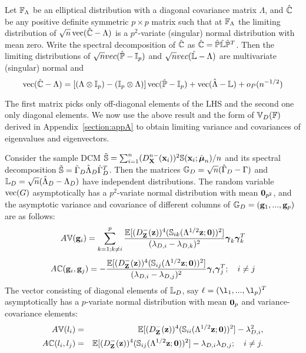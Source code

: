 \begin{Theorem}
\label{Theorem:decomp} \citep{taskinen12}
Let ${\mathbb{F}}_\Lambda$ be an elliptical distribution with a diagonal covariance matrix $\Lambda$, and $\hat {{\mathbb{C}}}$ be any positive definite symmetric $p \times p$ matrix such that at ${\mathbb{F}}_\Lambda$ the limiting distribution of $\sqrt n \operatorname*{vec} (\hat {{\mathbb{C}}} - \Lambda)$ is a $p^2$-variate (singular) normal distribution with mean zero. Write the spectral decomposition of $\hat {{\mathbb{C}}}$ as $\hat {{\mathbb{C}}} = \hat {{\mathbb{P}}} \hat {{\mathbb{L}}} \hat {{\mathbb{P}}}^T$. Then the limiting distributions of $\sqrt n vec(\hat {{\mathbb{P}}} - {\mathbb{I}}_p)$ and $\sqrt n vec(\hat{{\mathbb{L}}} - \Lambda)$ are multivariate (singular) normal and
%
\begin{equation} \label{equation:decompEq}
\operatorname*{vec} (\hat {{\mathbb{C}}} - \Lambda) =
\left[ (\Lambda \otimes {\mathbb{I}}_p) - ({\mathbb{I}}_p \otimes \Lambda) \right]
\operatorname*{vec} (\hat {{\mathbb{P}}} - {\mathbb{I}}_p) + \operatorname*{vec} (\hat\Lambda - {\mathbb{L}}) + o_P(n^{-1/2})
\end{equation}
\end{Theorem}

The first matrix picks only off-diagonal elements of the LHS and the second one only diagonal elements. We now use the above result and the form of ${\mathbb{V}}_D({\mathbb{F}})$ derived in Appendix~\ref{section:appA} to obtain limiting variance and covariances of eigenvalues and eigenvectors.

\begin{Corollary} \label{Corollary:eigendist}
Consider the sample DCM $ \tilde {{\mathbb{S}}} = \sum_{i=1}^n (D^{n-}_{\mathbf{X}} ({\bf{x}}_i))^2 {\mathbb{S}} ({\bf{x}}_i; \hat{{\boldsymbol{\mu}}}_n)/n $ and its spectral decomposition $\tilde {{\mathbb{S}}} = \hat\Gamma_D \hat\Lambda_D \hat\Gamma_D^T $. Then the matrices ${\mathbb{G}}_D = \sqrt n (\hat\Gamma_D - \Gamma) $ and ${\mathbb{L}}_D = \sqrt n (\hat\Lambda_D - \Lambda_{D}) $ have independent distributions. The random variable $\operatorname*{vec}(G)$ asymptotically has a $p^2$-variate normal distribution with mean ${\bf 0}_{p^2}$, and the asymptotic variance and covariance of different columns of ${\mathbb{G}}_D = ({\bf{g}}_1,...,{\bf{g}}_p)$ are as follows:
%
\begin{equation} \label{equation:DevEq}
A{\mathbb{V}}({\bf{g}}_i) = \sum_{k=1; k \neq i}^p \frac{{\mathbb{E}} [ (D^-_{\mathbf{Z}} ({\bf{z}}))^4 ({\mathbb{S}}_{ik}( \Lambda^{1/2} {\bf{z}}; {\bf 0}))^2 ]}
{(\lambda_{D,i} - \lambda_{D,k})^2} {\boldsymbol{\gamma}}_k {\boldsymbol{\gamma}}_k^T
\end{equation}
%
\begin{equation}
A{\mathbb{C}}( {\bf{g}}_i, {\bf{g}}_j) = - \frac{{\mathbb{E}} [ (D^-_{\mathbf{Z}} ({\bf{z}}))^4 ({\mathbb{S}}_{ij}( \Lambda^{1/2} {\bf{z}}; {\bf 0}))^2 ]}
{(\lambda_{D,i} - \lambda_{D,j})^2} {\boldsymbol{\gamma}}_i {\boldsymbol{\gamma}}_j^T; \quad i \neq j
\end{equation}
%
The vector consisting of diagonal elements of ${\mathbb{L}}_D$, say $\mathbf{\ell} = (\l_1,...,\l_p)^T$ asymptotically has a $p$-variate normal distribution with mean ${\bf 0}_p$ and variance-covariance elements:
%
\begin{eqnarray}
A{\mathbb{V}}(l_i) &=&{\mathbb{E}} [ (D^-_{\mathbf{Z}} ({\bf{z}}))^4 ({\mathbb{S}}_{ii}( \Lambda^{1/2} {\bf{z}}; {\bf 0}))^2 ] - \lambda_{D,i}^2,\\
A{\mathbb{C}}(l_i, l_j) &=& {\mathbb{E}} [ (D^-_{\mathbf{Z}} ({\bf{z}}))^4 ({\mathbb{S}}_{ij}( \Lambda^{1/2} {\bf{z}}; {\bf 0}))^2 ] - \lambda_{D,i} \lambda_{D,j}; \quad i \neq j.
\end{eqnarray}
%
\end{Corollary}

